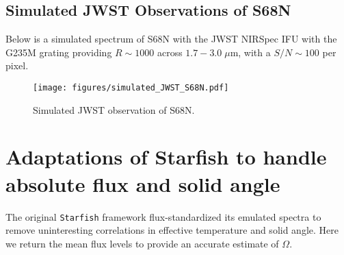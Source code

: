 \documentclass[twocolumn]{emulateapj}%
\begin{document}

\subsection{Simulated JWST Observations of S68N}

Below is a simulated spectrum of S68N with the JWST NIRSpec IFU with the G235M grating providing $R\sim1000$ across $1.7-3.0 \; \mu$m, with a $S/N \sim 100$ per pixel.  

\begin{figure}
 \centering
 \texttt{[image: figures/simulated\_JWST\_S68N.pdf]}
 \caption{Simulated JWST observation of S68N.}
 \label{fig:JWST}
\end{figure}


\clearpage
\pagebreak


\appendix

\section{Adaptations of Starfish to handle absolute flux and solid angle}
The original \texttt{Starfish} framework flux-standardized its emulated spectra to remove uninteresting correlations in effective temperature and solid angle.  Here we return the mean flux levels to provide an accurate estimate of $\Omega$.
\end{document}
